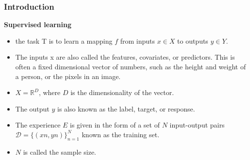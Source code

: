 \documentclass[spanish]{beamer}
\begin{document}
\begin{frame}
\frametitle{Introduction}
\textbf{Supervised learning}
\begin{itemize}
\item the task T is to learn a mapping $f$ from inputs $x \in X$ to outputs $y \in Y$.
\item The inputs x are also called the features, covariates, or predictors. This is often a fixed dimensional vector of numbers, such as the height
and weight of a person, or the pixels in an image.
\item $X = \mathbb{R}^{D}$, where $D$ is the dimensionality of the vector.
\item  The output $y$ is also known as the label, target, or response.
\item The experience $E$ is given in the form of a set of $N$ input-output pairs $ \mathcal{D} = \lbrace{(xn, yn)}\rbrace_{n=1}^{N}$ known as the training set.
\item $N$ is called the sample size.
\end{itemize} 

\end{frame}
\end{document}

